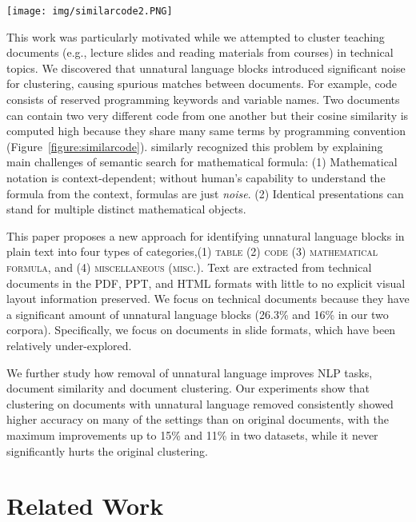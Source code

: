 \documentclass[11pt,letterpaper]{article}
\begin{document}
\begin{figure*}[t]
\centering
\texttt{[image: img/similarcode2.PNG]}
\caption{An example of how unnatural language confuses NLP tools. The left and right pseudo-codes are very different, but standard NLP similarity functions such as cosine similarity can easily be confused by the terms highlighted in yellow.}
\label{figure:similarcode}
\end{figure*}

This work was particularly motivated while we attempted to cluster teaching documents (e.g., lecture slides and reading materials from courses) in technical topics. We discovered that unnatural language blocks introduced significant noise for clustering, causing spurious matches between documents. For example, code consists of reserved programming keywords and variable names. Two documents can contain two very different code from one another but their cosine similarity is computed high because they share many same terms by programming convention (Figure~\ref{figure:similarcode}). \cite{kohlhase} similarly recognized this problem by explaining main challenges of semantic search for mathematical formula: (1) Mathematical notation is context-dependent; without human's capability to understand the formula from the context, formulas are just \emph{noise}. (2) Identical presentations can stand for multiple distinct mathematical
objects. 

This paper proposes a new approach for identifying unnatural language blocks in plain text into four types of categories,(1) \textsc{table} (2) \textsc{code} (3) \textsc{mathematical formula}, and (4) \textsc{miscellaneous (misc.)}. Text are extracted from technical documents in the PDF, PPT, and HTML formats with little to no explicit visual layout information preserved. We focus on technical documents because they have a significant amount of unnatural language blocks (26.3\% and 16\% in our two corpora). Specifically, we focus on documents in slide formats, which have been relatively under-explored. 

We further study how removal of unnatural language improves NLP tasks, document similarity and document clustering.  Our experiments show that clustering on documents with unnatural language removed consistently showed higher accuracy on many of the settings than on original documents, with the maximum improvements up to 15\% and 11\% in two datasets, while it never significantly hurts the original clustering. 

\section{Related Work}
\end{document}
